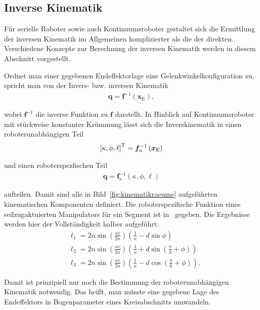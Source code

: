 \subsection{Inverse Kinematik}
\label{subesc:inverseKinematik}

Für serielle Roboter sowie auch Kontinuumsroboter gestaltet sich die Ermittlung der inversen Kinematik im Allgemeinen komplizierter als die der direkten. Verschiedene Konzepte zur Berechnung der inversen Kinematik werden in diesem Abschnitt vorgestellt. \newline

Ordnet man einer gegebenen Endeffektorlage eine Gelenkwinkelkonfiguration zu, spricht man von der Invers- bzw. inversen Kinematik
\begin{align}
\bm{q}  = \bm{f}^{-1} \left( \bm{x}_{\mathrm{E}} \right), 
\label{eq:inverskinematik}
\end{align} 

wobei $\bm{f}^{-1}$ die inverse Funktion zu $\bm{f}$ darstellt. In Hinblick auf Kontinuumsroboter mit stückweise konstanter Krümmung lässt sich die Inverskinematik in einen roboterunabhängigen Teil
\begin{align}
\left[ \kappa, \phi, \ell \right]^{\mathrm{T}} = \bm{f}^{-1}_{\mathrm{u}} \left( \bm{x}_{\mathrm{E}} \right)
\end{align}

und einen roboterspezfischen Teil
\begin{align}
\bm{q} = \bm{f}^{-1}_{\mathrm{s}} \left( \kappa, \phi, \ell \right)
\end{align}

aufteilen. Damit sind alle in Bild~\ref{fig:kinematikraeume} aufgeführten kinematischen Komponenten definiert. Die roboterspezifische Funktion eines seilzugaktuierten Manipulators für ein Segment ist in~\cite{JW06} gegeben. Die Ergebnisse werden hier der Vollständigkeit halber aufgeführt:
\begin{align}
&\ell_1 = 2n \sin \left( \frac{\kappa c}{2n} \right) \left( \frac{1}{\kappa} - d \sin\phi \right) \\
&\ell_2 = 2n \sin \left( \frac{\kappa c}{2n} \right) \left( \frac{1}{\kappa} + d \sin \left(\frac{\pi}{3} + \phi  \right) \right) \\
&\ell_3 = 2n \sin \left( \frac{\kappa c}{2n} \right) \left( \frac{1}{\kappa} - d \cos \left(\frac{\pi}{6} + \phi  \right) \right).
\end{align}

Damit ist prinzipiell nur noch die Bestimmung der roboterunabhängigen Kinematik notwendig. Das heißt, man müsste eine gegebene Lage des Endeffektors in Bogenparameter eines Kreisabschnitts umwandeln. 

